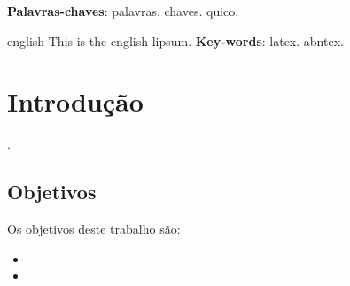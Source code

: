 \documentclass{utfpr-pg}
\begin{document}
\frenchspacing

\imprimircapa
\imprimirfolhaderosto

 \begin{resumo}
   \lipsum[23]
   \vspace{\onelineskip}
   \noindent
   \textbf{Palavras-chaves}: palavras. chaves. quico.
 \end{resumo}

 \begin{resumo}[Abstract]
   \begin{otherlanguage*}{english}
     This is the english lipsum. \lipsum[2]
     \vspace{\onelineskip}
     \noindent
     \textbf{Key-words}: latex. abntex.
   \end{otherlanguage*}
 \end{resumo}






\tableofcontents*
\cleardoublepage

\textual

\chapter{Introdução}
\lipsum[1]
\cite{kwiatkowska_probabilistic_2002}.

\section{Objetivos}
Os objetivos deste trabalho são:
\begin{itemize}
\item \lipsum[2]
\item \lipsum[3]
\end{itemize}
\end{document}
